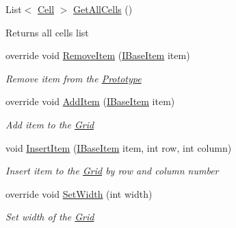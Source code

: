 \begin{DoxyCompactItemize}
\mbox{\label{class_space_v_i_l_1_1_grid_ada36a5ab920b909fdb5d776deb5525b1}} 
List$<$ \mbox{\hyperlink{class_space_v_i_l_1_1_cell}{Cell}} $>$ \mbox{\hyperlink{class_space_v_i_l_1_1_grid_ada36a5ab920b909fdb5d776deb5525b1}{Get\+All\+Cells}} ()
\begin{DoxyCompactList}\small\item\em \begin{DoxyReturn}{Returns}
all cells list 
\end{DoxyReturn}
\end{DoxyCompactList}\item 
override void \mbox{\hyperlink{class_space_v_i_l_1_1_grid_a75bf61cabb387baea7461141dce079fb}{Remove\+Item}} (\mbox{\hyperlink{interface_space_v_i_l_1_1_core_1_1_i_base_item}{I\+Base\+Item}} item)
\begin{DoxyCompactList}\small\item\em Remove item from the \mbox{\hyperlink{class_space_v_i_l_1_1_prototype}{Prototype}} \end{DoxyCompactList}\item 
override void \mbox{\hyperlink{class_space_v_i_l_1_1_grid_a5b339dbf56352afd9546f66ef4c02416}{Add\+Item}} (\mbox{\hyperlink{interface_space_v_i_l_1_1_core_1_1_i_base_item}{I\+Base\+Item}} item)
\begin{DoxyCompactList}\small\item\em Add item to the \mbox{\hyperlink{class_space_v_i_l_1_1_grid}{Grid}} \end{DoxyCompactList}\item 
void \mbox{\hyperlink{class_space_v_i_l_1_1_grid_a2292fca3813854b6077716e00ad54df4}{Insert\+Item}} (\mbox{\hyperlink{interface_space_v_i_l_1_1_core_1_1_i_base_item}{I\+Base\+Item}} item, int row, int column)
\begin{DoxyCompactList}\small\item\em Insert item to the \mbox{\hyperlink{class_space_v_i_l_1_1_grid}{Grid}} by row and column number \end{DoxyCompactList}\item 
override void \mbox{\hyperlink{class_space_v_i_l_1_1_grid_a2d3ce59b92ad9ca3bba2fb69feb549cb}{Set\+Width}} (int width)
\begin{DoxyCompactList}\small\item\em Set width of the \mbox{\hyperlink{class_space_v_i_l_1_1_grid}{Grid}} \end{DoxyCompactList}\item 

\end{DoxyCompactItemize}
